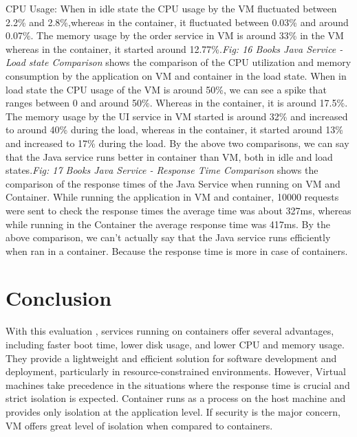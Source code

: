 CPU Usage: When in idle state the CPU usage by the VM fluctuated between 2.2\% and 2.8\%,whereas in the container, it fluctuated between 0.03\% and around 0.07\%. The memory usage by the order service in VM is around 33\% in the VM whereas in the container, it started around 12.77\%.\emph{Fig: 16 Books Java Service - Load state Comparison} shows the comparison of the CPU utilization and memory consumption by the application on VM and container in the load state. When in load state the CPU usage of the VM is around 50\%, we can see a spike that ranges between 0 and around 50\%. Whereas in the container, it is around 17.5\%. The memory usage by the UI service in VM started is around 32\% and increased to around 40\% during the load, whereas in the container, it started around 13\% and  increased to 17\% during the load.
By the above two comparisons, we can say that the Java service runs better in container than VM, both in idle and load states.\emph{Fig: 17 Books Java Service - Response Time Comparison} shows the comparison of the response times of the Java Service when running on VM and Container.
While running the application in VM and container, 10000 requests were sent to check the response times the average time was about 327ms, whereas while running in the Container the average response time was 417ms. By the above comparison, we can't  actually say that the Java service runs efficiently when ran in a container. Because the response time is more in case of containers. 

\section{Conclusion}
With this evaluation , services running on containers offer several advantages, including faster boot time, lower disk usage, and lower CPU and memory usage. They provide a lightweight and efficient solution for software development and deployment, particularly in resource-constrained environments.
However, Virtual machines take precedence in the situations where the response time is crucial and strict isolation is expected. Container runs as a process on the host machine and provides only isolation at the application level. If security is the major concern, VM offers great level of isolation when compared to containers.





